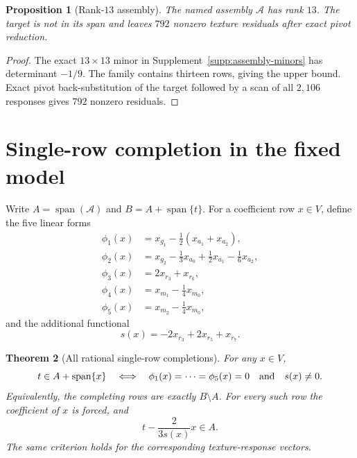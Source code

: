 \documentclass[12pt]{article}
\newtheorem{theorem}{Theorem}[section]
\newtheorem{proposition}[theorem]{Proposition}
\theoremstyle{definition}
\theoremstyle{remark}
\newcommand{\Span}{\operatorname{span}}
\newcommand{\target}{t}
\begin{document}
\begin{proposition}[Rank-$13$ assembly]\label{prop:rank13}
The named assembly $\mathcal A$ has rank $13$.  The target is not in its
span and leaves $792$ nonzero texture residuals after exact pivot reduction.
\end{proposition}

\begin{proof}
The exact $13\times13$ minor in Supplement~\ref{supp:assembly-minors} has
determinant $-1/9$.  The family contains thirteen rows, giving the upper bound.  Exact
pivot back-substitution of the target followed by a scan of all $2{,}106$
responses gives $792$ nonzero residuals.
\end{proof}

\section{Single-row completion in the fixed model}\label{sec:all-completions}

Write $A=\Span(\mathcal A)$ and $B=A+\Span\{\target\}$.  For a coefficient
row $x\in V$, define the five linear forms
\begin{equation}\label{eq:completion-annihilators}
\begin{aligned}
\phi_1(x)&=x_{g_1}-\tfrac12(x_{a_1}+x_{a_2}),\\
\phi_2(x)&=x_{g_2}-\tfrac13x_{a_0}+\tfrac12x_{a_1}-\tfrac16x_{a_2},\\
\phi_3(x)&=2x_{r_3}+x_{r_6},\\
\phi_4(x)&=x_{m_1}-\tfrac14x_{m_0},\\
\phi_5(x)&=x_{m_2}-\tfrac14x_{m_0},
\end{aligned}
\end{equation}
and the additional functional
\begin{equation}\label{eq:assembly-functional}
s(x)=-2x_{r_3}+2x_{r_5}+x_{r_7}.
\end{equation}

\begin{theorem}[All rational single-row completions]\label{thm:all-completions}
For any $x\in V$,
\[
\target\in A+\Span\{x\}
\quad\Longleftrightarrow\quad
\phi_1(x)=\cdots=\phi_5(x)=0\quad\hbox{and}\quad s(x)\ne0.
\]
Equivalently, the completing rows are exactly $B\setminus A$.  For every such
row the coefficient of $x$ is forced, and
\begin{equation}\label{eq:general-completion}
\target-\frac{2}{3s(x)}x\in A.
\end{equation}
The same criterion holds for the corresponding texture-response vectors.
\end{theorem}
\end{document}
